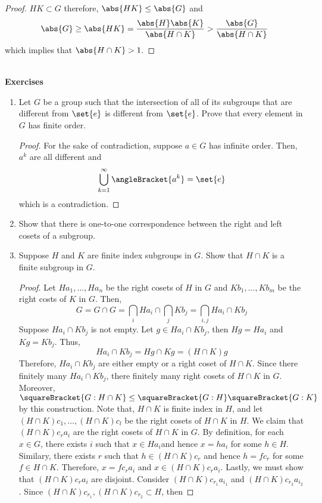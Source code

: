 \begin{proof}
    \(HK \subset G\) therefore, \(\abs{HK} \leq \abs{G}\) and 
    \begin{equation*}
        \abs{G} \geq \abs{HK}  = \dfrac{\abs{H} \abs{K}}{\abs{H \cap K}} > \dfrac{\abs{G}}{\abs{H \cap K}} 
    \end{equation*}
    which implies that \(\abs{H \cap K} > 1\).
\end{proof}
\ \\ 
{\Large{\textbf{Exercises}}}
\begin{enumerate}
    \item Let \(G\) be a group such that the intersection of all of its subgroups that are different from \(\set{e}\) is different from \(\set{e}\). Prove that every element in \(G\) has finite order.
    \begin{proof}
        For the sake of contradiction, suppose \(a \in G\) has infinite order. Then, \(a^k\) are all different and 
        \begin{equation*}
            \bigcup_{k = 1}^{\infty} \angleBracket{a^k} = \set{e}
        \end{equation*}
        which is a contradiction.
    \end{proof}
    \item Show that there is one-to-one correspondence between the right and left cosets of a subgroup.
    \item Suppose \(H\) and \(K\) are finite index subgroups in \(G\). Show that \(H \cap K\) is a finite subgroup in \(G\).
    \begin{proof}
        Let \(Ha_1, \dots , Ha_n\) be the right cosets of \(H\) in \(G\) and \(Kb_1, \dots , Kb_m\) be the right costs of \(K\) in \(G\). Then, 
        \begin{equation*}
            G = G \cap G = \bigcap_i Ha_i \cap \bigcap_j Kb_j = \bigcap_{i,j} Ha_i \cap Kb_j
        \end{equation*}
        Suppose \(Ha_i \cap Kb_j\) is not empty. Let \(g \in Ha_i \cap Kb_j\), then \(Hg = Ha_i\) and \(Kg = Kb_j\). Thus, 
        \begin{equation*}
            Ha_i \cap Kb_j = Hg \cap Kg = (H \cap K)g
        \end{equation*}
        Therefore, \(Ha_i \cap Kb_j\) are either empty or a right coset of \(H \cap K\). Since there finitely many \(Ha_i \cap Kb_j\), there finitely many right cosets of \(H \cap K\) in \(G\). Moreover, \(\squareBracket{G:H \cap K} \leq \squareBracket{G:H} \squareBracket{G:K}\) by this construction. Note that, \(H \cap K\) is finite index in \(H\), and let \((H \cap K)c_1, \dots , (H \cap K)c_l\) be the right cosets of \(H \cap K\) in \(H\). We claim that \((H \cap K)c_ra_i\) are the right cosets of \(H \cap K\) in \(G\). By definition, for each \(x \in G\), there exists \(i\) such that \(x \in Ha_i\)and hence \(x = ha_i\) for some \(h \in H\). Similary, there exists \(r\) such that \(h \in (H \cap K)c_r\) and hence \(h = fc_r\) for some \(f \in H \cap K\). Therefore, \(x = fc_ra_i\) and \(x \in (H \cap K)c_ra_i\). Lastly, we must show that \((H \cap K)c_ra_i\) are disjoint. Consider \((H \cap K)  c_{r_1}a_{i_1}\) and \((H \cap K)c_{r_2}a_{i_2}\). Since \((H \cap K)c_{r_1}, (H \cap K)c_{r_2} \subset H\), then 

\end{proof}
\end{enumerate}
